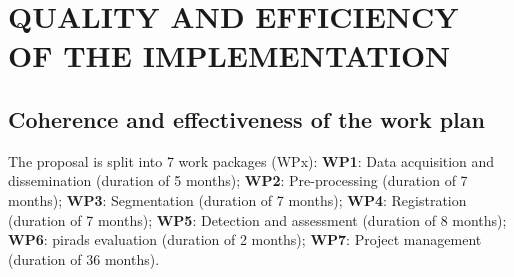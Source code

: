 \section{QUALITY AND EFFICIENCY OF THE IMPLEMENTATION}
\label{sec:implementation}

\subsection{Coherence and effectiveness of the work plan}

The proposal is split into 7 work packages (WPx):
\textbf{WP1}: Data acquisition and dissemination (duration of 5 months);
\textbf{WP2}: Pre-processing (duration of 7 months);
\textbf{WP3}: Segmentation (duration of 7 months);
\textbf{WP4}: Registration (duration of 7 months);
\textbf{WP5}: Detection and assessment (duration of 8 months);
\textbf{WP6}: \ac{pirads} evaluation (duration of 2 months);
\textbf{WP7}: Project management (duration of 36 months).

